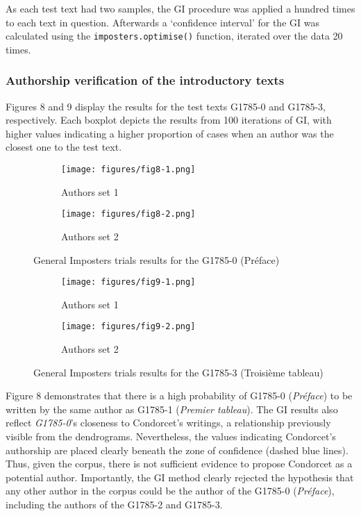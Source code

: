 \documentclass[12pt, letterpaper]{article}
\begin{document}
As each test text had two samples, the GI procedure was applied a hundred times to each text in question\footnotemark[5]. Afterwards a `confidence interval' for the GI was calculated using the \verb|imposters.optimise()| function, iterated over the data 20 times.

\subsubsection{Authorship verification of the introductory texts}

Figures 8 and 9 display the results for the test texts G1785-0 and G1785-3, respectively. Each boxplot depicts the results from 100 iterations of GI, with higher values indicating a higher proportion of cases when an author was the closest one to the test text. 

\begin{figure}
\begin{subfigure}{.5\textwidth}
  \centering
  \texttt{[image: figures/fig8-1.png]}
  \caption{Authors set 1}
\end{subfigure}%
\begin{subfigure}{.5\textwidth}
  \centering
  \texttt{[image: figures/fig8-2.png]}
  \caption{Authors set 2}
\end{subfigure}
\caption{General Imposters trials results for the G1785-0 (Préface)}
\label{fig8}
\end{figure}

\begin{figure}
\begin{subfigure}{.5\textwidth}
  \centering
  \texttt{[image: figures/fig9-1.png]}
  \caption{Authors set 1}
\end{subfigure}
\begin{subfigure}{.5\textwidth}
  \centering
  \texttt{[image: figures/fig9-2.png]}
  \caption{Authors set 2}
\end{subfigure}
\caption{General Imposters trials results for the G1785-3 (Troisième tableau)}
\label{fig9}
\end{figure}

Figure 8 demonstrates that there is a high probability of G1785-0 (\emph{Préface}) to be written by the same author as G1785-1 (\emph{Premier tableau}). The GI results also reflect \emph{G1785-0}'s closeness to Condorcet's writings, a relationship previously visible from the dendrograms. Nevertheless, the values indicating Condorcet's authorship are placed clearly beneath the zone of confidence (dashed blue lines). Thus, given the corpus, there is not sufficient evidence to propose Condorcet as a potential author. Importantly, the GI method clearly rejected the hypothesis that any other author in the corpus could be the author of the G1785-0 (\emph{Préface}), including the authors of the G1785-2 and G1785-3.
\end{document}
